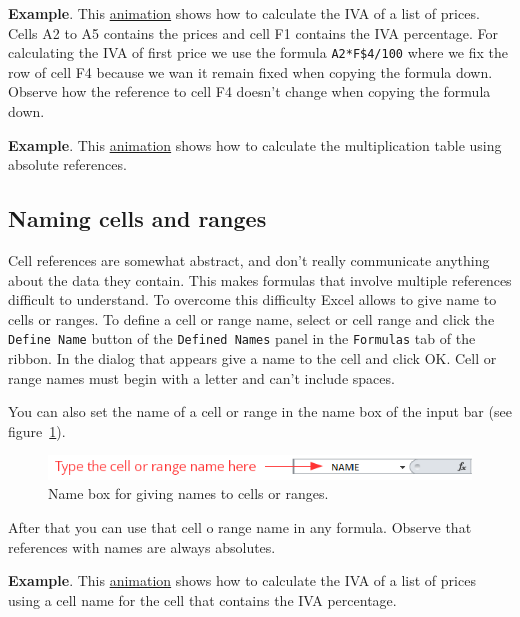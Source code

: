 \textbf{Example}. This
\href{http://aprendeconalf.es/office/excel/manual/img/example_copying_formulas_with_absolute_references.gif}{animation} shows how to calculate the IVA of a list of prices. Cells A2 to A5 contains the prices and cell F1 contains the IVA percentage. For calculating the IVA of first price we use the formula \texttt{A2*F\$4/100} where we fix the row of cell F4 because we wan it remain fixed when copying the formula down. Observe how the reference to cell F4 doesn't change when copying the formula down.

\textbf{Example}. This \href{http://aprendeconalf.es/office/excel/manual/img/example_multiplication_table.gif}{animation} shows how to calculate the multiplication table using absolute references.

\subsection{Naming cells and ranges}\hypertarget{naming-cells-and-ranges}{}\label{naming-cells-and-ranges}

Cell references are somewhat abstract, and don't really communicate anything about the data they contain. This makes formulas that involve multiple references difficult to understand. To overcome this difficulty Excel allows to give name to cells or ranges. To define a cell or range name, select or cell range and click the \texttt{Define Name} button of the \texttt{Defined Names} panel in the \texttt{Formulas} tab of the ribbon. In the dialog that appears give a name to the cell and click OK. Cell or range names must begin with a letter and can't include spaces.

You can also set the name of a cell or range in the name box of the input bar (see figure~\ref{img-name_box}).

\begin{figure}[htbp]
\begin{center}
\includegraphics[scale=0.7]{../img/name_box.png}
\end{center}
\caption{Name box for giving names to cells or ranges.}
\label{img-name_box}
\end{figure}

After that you can use that cell o range name in any formula. Observe that references with names are always absolutes.

\textbf{Example}. This \href{http://aprendeconalf.es/office/excel/manual/img/example_formulas_with_defined_names.gif}{animation} shows how to calculate the IVA of a list of prices using a cell name for the cell that contains the IVA percentage.

